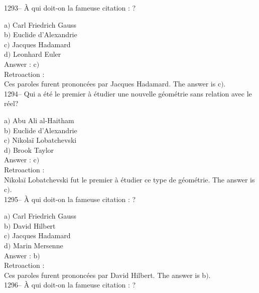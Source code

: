 ﻿\documentclass[letterpaper, 12pt]{article}
\begin{document}
1293-- \`A qui doit-on la fameuse citation : \fg?

a$)$ Carl Friedrich Gauss \\
b$)$ Euclide d'Alexandrie \\
c$)$ Jacques Hadamard \\
d$)$ Leonhard Euler\\

Answer : c$)$\\

Retroaction : \\
Ces paroles furent prononc\'ees par Jacques Hadamard.
The answer is  c$)$.\\

1294-- Qui a \'et\'e le premier \`a \'etudier une nouvelle
g\'eom\'etrie sans relation avec le r\'eel?

a$)$ Abu Ali al-Haitham \\
b$)$ Euclide d'Alexandrie \\
c$)$ Nikola\"i Lobatchevski \\
d$)$ Brook Taylor\\

Answer : c$)$\\

Retroaction : \\
Nikola\"i Lobatchevski fut le premier \`a \'etudier ce type de
g\'eom\'etrie.
The answer is  c$)$.\\

1295-- \`A qui doit-on la fameuse citation : \fg ?

a$)$ Carl Friedrich Gauss \\
b$)$ David Hilbert \\
c$)$ Jacques Hadamard \\
d$)$ Marin Mersenne\\

Answer : b$)$\\

Retroaction : \\
Ces paroles furent prononc\'ees par David Hilbert.
The answer is  b$)$.\\

1296-- \`A qui doit-on la fameuse citation : \fg ?
\end{document}
